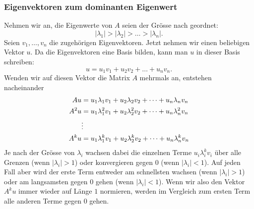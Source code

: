 \subsubsection{Eigenvektoren zum dominanten Eigenwert\label{section:dominant}}
Nehmen wir an, die Eigenwerte von $A$
seien der Grösse nach geordnet:
\[
|\lambda_1| > |\lambda_2| > \dots > |\lambda_n|.
\]
Seien $v_1,\dots,v_n$ die zugehörigen Eigenvektoren.
Jetzt nehmen wir einen beliebigen Vektor $u$.
Da die Eigenvektoren eine Basis bilden,
kann man $u$ in dieser Basis schreiben:
\[
u=u_1v_1+u_2v_2+\dots+u_nv_n.
\]
Wenden wir auf diesen Vektor die Matrix $A$ mehrmals an, entstehen
nacheinander
\begin{align}
Au&=
u_1\lambda_1v_1+u_2\lambda_2v_2+\dots+u_n\lambda_nv_n
\notag
\\
A^2u&=
u_1\lambda_1^2v_1+u_2\lambda_2^2v_2+\dots+u_n\lambda_n^2v_n
\notag
\\
&\vdots
\\
A^ku&=
u_1\lambda_1^kv_1+u_2\lambda_2^kv_2+\dots+u_n\lambda_n^kv_n
\label{power-method-vectors}
\end{align}
Je nach der Grösse von $\lambda_i$ wachsen dabei die einzelnen
Terme $u_i\lambda_i^kv_i$ über alle Grenzen (wenn $|\lambda_i|>1$)
oder konvergieren gegen $0$ (wenn $|\lambda_i|<1$).
Auf jeden Fall
aber wird der erste Term entweder am schnellsten wachsen (wenn $|\lambda_i|>1$)
oder am langsamsten gegen $0$ gehen (wenn $|\lambda_i|<1$).
Wenn wir also den Vektor $A^ku$ immer wieder auf Länge $1$ normieren, 
werden im Vergleich zum ersten Term alle anderen Terme gegen $0$ gehen.

